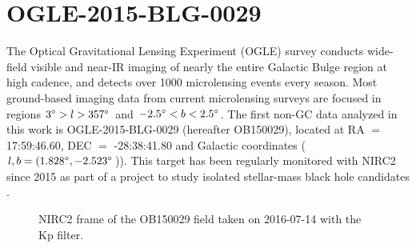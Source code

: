 \documentclass[]{spie}  %
\begin{document}
 
\section{OGLE-2015-BLG-0029} \label{sec:ogle-data}
The Optical Gravitational Lensing Experiment (OGLE) survey \cite{udalski:1992a} conducts wide-field visible and near-IR imaging of nearly the entire Galactic Bulge region at high cadence, and detects over 1000 microlensing events every season. Most ground-based imaging data from current microlensing surveys are focused in regions $3\degree > l > 357\degree$ and $-2.5\degree < b < 2.5\degree$. The first non-GC data analyzed in this work is OGLE-2015-BLG-0029 (hereafter OB150029), located at RA $=$ 17:59:46.60, DEC $=$ -28:38:41.80 and Galactic coordinates ($l,b = (1.828\degree, -2.523\degree$)). This target has been regularly monitored with NIRC2 since 2015 as part of a project to study isolated stellar-mass black hole candidates \citep{lu:inprep}.

\begin{figure}[!h]
 \caption{\footnotesize NIRC2 frame of the OB150029 field taken on 2016-07-14 with the Kp filter.} \label{fig:ob150029}
\end{figure}
\end{document}
